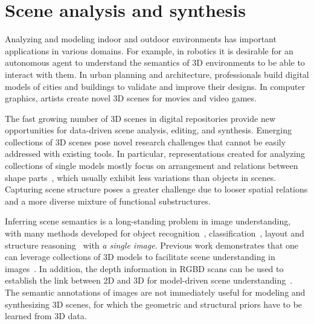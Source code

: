 \section{Scene analysis and synthesis}
\label{sec:scene}
Analyzing and modeling indoor and outdoor environments has important applications in various domains. For example, in robotics it is desirable for an autonomous agent to understand the semantics of 3D environments to be able to interact with them. In urban planning and architecture, professionals build digital models of cities and buildings to validate and improve their designs. In computer graphics, artists create novel 3D scenes for movies and video games.



The fast growing number of 3D scenes in digital repositories provide new opportunities for data-driven scene analysis, editing, and synthesis. Emerging collections of 3D scenes pose novel research challenges that cannot be easily addressed with existing tools.  In particular, representations created for analyzing collections of single models mostly focus on arrangement and relations between shape parts~\cite{Mitra:2014:SASP}, which usually exhibit less variations than objects in scenes. Capturing scene structure poses a greater challenge due to looser spatial relations and a more diverse mixture of functional substructures.

%

Inferring scene semantics is a long-standing problem in image understanding, with many methods developed for object recognition~\cite{quattoni2009}, classification~\cite{swadzba2010},
layout and structure reasoning~\cite{Choi:2013:UIS,Fouhey:2013:DDP} with \emph{a single image}. Previous work demonstrates that one can leverage collections of 3D models to facilitate scene understanding in images~\cite{Satkin:2012:DDS}.
In addition, the depth information in RGBD scans can be used to establish the link between 2D and 3D for model-driven scene understanding~\cite{Silberman:2012:ISS}. The semantic annotations of images are not immediately useful for modeling and synthesizing 3D scenes, for which the geometric and structural priors have to be learned from 3D data.


